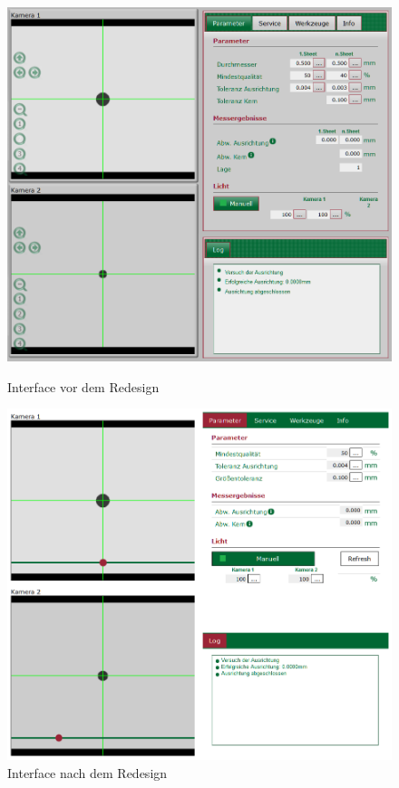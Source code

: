\documentclass[xcolor=dvipsnames,11pt,paper=a4paper]{report}
\begin{document}
\begin{figure}[H]
	\begin{minipage}{0.5\textwidth}
		\centering
		\includegraphics[width=\textwidth, height=\textwidth]{media/webinterface-alt.png}
		\caption{Interface vor dem Redesign}
		\label{fig:ivs-webinterface-alt}
	\end{minipage}
	\begin{minipage}{0.5\textwidth}
		\centering
		\includegraphics[width=\textwidth, height=\textwidth]{media/webinterface.png}
		\caption{Interface nach dem Redesign}
		\label{fig:ivs-webinterface}
	\end{minipage}
\end{figure}
\end{document}

